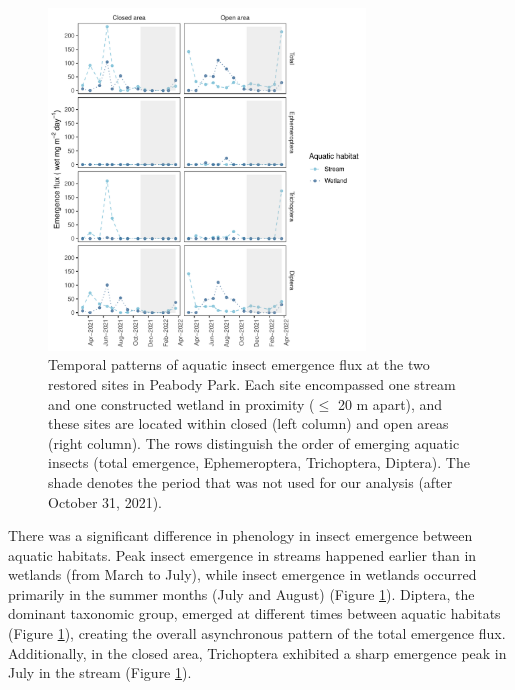 \documentclass[11pt, class=article, crop=false]{standalone}
\begin{document}
\begin{figure}
    \centering
    \includegraphics[width=0.75\textwidth]{output/figure_emg.pdf}
    \caption{Temporal patterns of aquatic insect emergence flux at the two restored sites in Peabody Park. Each site encompassed one stream and one constructed wetland in proximity ($\le$ 20 m apart), and these sites are located within closed (left column) and open areas (right column).
    The rows distinguish the order of emerging aquatic insects (total emergence, Ephemeroptera, Trichoptera, Diptera).
    The shade denotes the period that was not used for our analysis (after October 31, 2021).}
    \label{fig:insect-phenology}
\end{figure}

There was a significant difference in phenology in insect emergence between aquatic habitats.
Peak insect emergence in streams happened earlier than in wetlands (from March to July), while insect emergence in wetlands occurred primarily in the summer months (July and August) (Figure \ref{fig:insect-phenology}).
Diptera, the dominant taxonomic group, emerged at different times between aquatic habitats (Figure \ref{fig:insect-phenology}), creating the overall asynchronous pattern of the total emergence flux.
Additionally, in the closed area, Trichoptera exhibited a sharp emergence peak in July in the stream (Figure \ref{fig:insect-phenology}).


\end{document}
